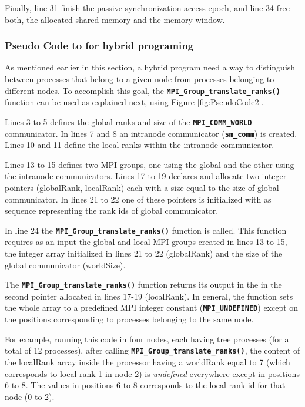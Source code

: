 Finally, line 31 finish the passive synchronization access epoch, and line 34 free both, the allocated shared memory and the memory window.


\subsubsection*{Pseudo Code to for hybrid programing}

As mentioned earlier in this section, a hybrid program need a way to distinguish between processes that belong to a given node from processes belonging to different nodes. To accomplish this goal, the \textbf{\texttt{MPI\_Group\_translate\_ranks()}} function can be used as explained next, using Figure \ref{fig:PseudoCode2}.
 

\medskip

Lines 3 to 5 defines the global ranks and size of the \textbf{\texttt{MPI\_COMM\_WORLD}} communicator. In lines 7 and 8 an intranode communicator (\textbf{\texttt{sm\_comm}}) is created. Lines 10 and 11 define the local ranks within the intranode communicator.

\medskip

Lines 13 to 15 defines two MPI groups, one using the global and the other using the intranode communicators. Lines 17 to 19 declares and allocate two integer pointers (globalRank, localRank) each with a size equal to the size of global communicator. In lines 21 to 22 one of these pointers is initialized with as sequence representing the rank ids of global communicator.

\medskip

In line 24 the \textbf{\texttt{MPI\_Group\_translate\_ranks()}} function is called. This function requires as an input the global and local MPI groups created in lines 13 to 15, the integer array initialized in lines 21 to 22 (globalRank) and the size of the global communicator (worldSize). 

\medskip

The \textbf{\texttt{MPI\_Group\_translate\_ranks()}} function returns its output in the in the second pointer allocated in lines 17-19 (localRank). In general, the function sets the whole array to a predefined MPI integer constant (\textbf{\texttt{MPI\_UNDEFINED}}) except on the positions corresponding to processes belonging to the same node. 

\medskip

For example, running this code in four nodes, each having tree processes (for a total of 12 processes), after calling \textbf{\texttt{MPI\_Group\_translate\_ranks()}}, the content of the localRank array inside the processor having a worldRank equal to 7 (which corresponds to local rank 1 in node 2) is \emph{undefined} everywhere except in positions 6 to 8. The values in positions 6 to 8 corresponds to the local rank id for that node (0 to 2).


